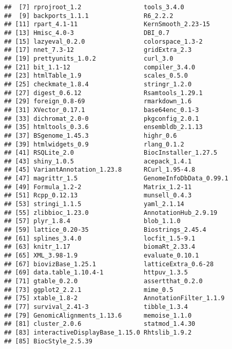 \documentclass{report}\usepackage[]{graphicx}\usepackage[usenames,dvipsnames]{color}
\newenvironment{knitrout}{}{} %
\begin{document}
\begin{knitrout}
\begin{kframe}
\begin{verbatim}
##  [7] rprojroot_1.2                 tools_3.4.0                  
##  [9] backports_1.1.1               R6_2.2.2                     
## [11] rpart_4.1-11                  KernSmooth_2.23-15           
## [13] Hmisc_4.0-3                   DBI_0.7                      
## [15] lazyeval_0.2.0                colorspace_1.3-2             
## [17] nnet_7.3-12                   gridExtra_2.3                
## [19] prettyunits_1.0.2             curl_3.0                     
## [21] bit_1.1-12                    compiler_3.4.0               
## [23] htmlTable_1.9                 scales_0.5.0                 
## [25] checkmate_1.8.4               stringr_1.2.0                
## [27] digest_0.6.12                 Rsamtools_1.29.1             
## [29] foreign_0.8-69                rmarkdown_1.6                
## [31] XVector_0.17.1                base64enc_0.1-3              
## [33] dichromat_2.0-0               pkgconfig_2.0.1              
## [35] htmltools_0.3.6               ensembldb_2.1.13             
## [37] BSgenome_1.45.3               highr_0.6                    
## [39] htmlwidgets_0.9               rlang_0.1.2                  
## [41] RSQLite_2.0                   BiocInstaller_1.27.5         
## [43] shiny_1.0.5                   acepack_1.4.1                
## [45] VariantAnnotation_1.23.8      RCurl_1.95-4.8               
## [47] magrittr_1.5                  GenomeInfoDbData_0.99.1      
## [49] Formula_1.2-2                 Matrix_1.2-11                
## [51] Rcpp_0.12.13                  munsell_0.4.3                
## [53] stringi_1.1.5                 yaml_2.1.14                  
## [55] zlibbioc_1.23.0               AnnotationHub_2.9.19         
## [57] plyr_1.8.4                    blob_1.1.0                   
## [59] lattice_0.20-35               Biostrings_2.45.4            
## [61] splines_3.4.0                 locfit_1.5-9.1               
## [63] knitr_1.17                    biomaRt_2.33.4               
## [65] XML_3.98-1.9                  evaluate_0.10.1              
## [67] biovizBase_1.25.1             latticeExtra_0.6-28          
## [69] data.table_1.10.4-1           httpuv_1.3.5                 
## [71] gtable_0.2.0                  assertthat_0.2.0             
## [73] ggplot2_2.2.1                 mime_0.5                     
## [75] xtable_1.8-2                  AnnotationFilter_1.1.9       
## [77] survival_2.41-3               tibble_1.3.4                 
## [79] GenomicAlignments_1.13.6      memoise_1.1.0                
## [81] cluster_2.0.6                 statmod_1.4.30               
## [83] interactiveDisplayBase_1.15.0 Rhtslib_1.9.2                
## [85] BiocStyle_2.5.39
\end{verbatim}
\end{kframe}
\end{knitrout}


\end{document}
